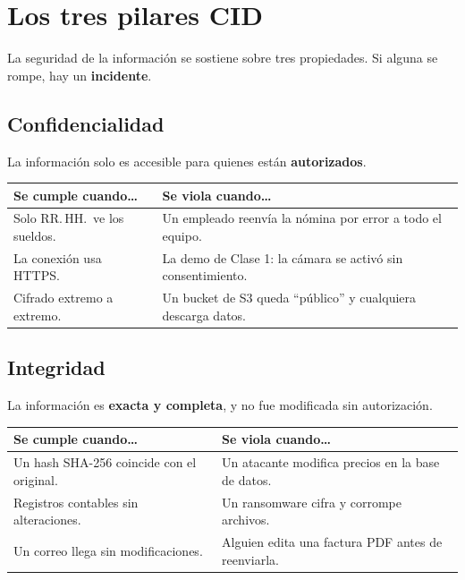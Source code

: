 \documentclass[12pt,a4paper]{article}
\begin{document}
\newpage
\section{Los tres pilares CID}

La seguridad de la información se sostiene sobre tres propiedades.
Si alguna se rompe, hay un \textbf{incidente}.

\subsection{Confidencialidad \;\textrm{\Large\lock}}
\begin{cajaDefinicion}
La información solo es accesible para quienes están \textbf{autorizados}.
\end{cajaDefinicion}

\begin{table}[h!]
\centering
\begin{tabularx}{\textwidth}{XX}
\toprule
\textbf{Se cumple cuando\ldots} & \textbf{Se viola cuando\ldots} \\
\midrule
Solo RR.\,HH.\ ve los sueldos. &
Un empleado reenvía la nómina por error a todo el equipo. \\[4pt]
La conexión usa HTTPS. &
La demo de Clase 1: la cámara se activó sin consentimiento. \\[4pt]
Cifrado extremo a extremo. &
Un bucket de S3 queda ``público'' y cualquiera descarga datos. \\
\bottomrule
\end{tabularx}
\end{table}

\subsection{Integridad \;\textrm{\Large\checkmark}}
\begin{cajaDefinicion}
La información es \textbf{exacta y completa}, y no fue modificada sin autorización.
\end{cajaDefinicion}

\begin{table}[h!]
\centering
\begin{tabularx}{\textwidth}{XX}
\toprule
\textbf{Se cumple cuando\ldots} & \textbf{Se viola cuando\ldots} \\
\midrule
Un hash SHA-256 coincide con el original. &
Un atacante modifica precios en la base de datos. \\[4pt]
Registros contables sin alteraciones. &
Un ransomware cifra y corrompe archivos. \\[4pt]
Un correo llega sin modificaciones. &
Alguien edita una factura PDF antes de reenviarla. \\
\bottomrule
\end{tabularx}
\end{table}
\end{document}
